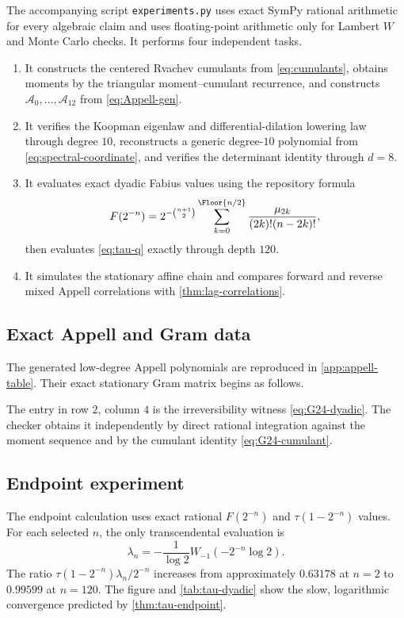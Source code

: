 \documentclass[11pt,a4paper]{article}
\theoremstyle{definition}
\theoremstyle{remark}
\newcommand{\Acal}{\mathcal A}
\begin{document}
The accompanying script \texttt{experiments.py} uses exact SymPy rational arithmetic for every algebraic claim and uses floating-point arithmetic only for Lambert $W$ and Monte Carlo checks. It performs four independent tasks.
\begin{enumerate}
\item It constructs the centered Rvachev cumulants from \eqref{eq:cumulants}, obtains moments by the triangular moment--cumulant recurrence, and constructs $\Acal_0,\ldots,\Acal_{12}$ from \eqref{eq:Appell-gen}.
\item It verifies the Koopman eigenlaw and differential-dilation lowering law through degree $10$, reconstructs a generic degree-$10$ polynomial from \eqref{eq:spectral-coordinate}, and verifies the determinant identity through $d=8$.
\item It evaluates exact dyadic Fabius values using the repository formula
\begin{equation}
 F(2^{-n})
 =2^{-\binom{n+1}{2}}
 \sum_{k=0}^{\Floor{n/2}}
 \frac{\mu_{2k}}{(2k)!(n-2k)!},
 \label{eq:dyadic-F-compute}
\end{equation}
then evaluates \eqref{eq:tau-q} exactly through depth $120$.
\item It simulates the stationary affine chain and compares forward and reverse mixed Appell correlations with \cref{thm:lag-correlations}.
\end{enumerate}



\subsection{Exact Appell and Gram data}

The generated low-degree Appell polynomials are reproduced in \cref{app:appell-table}. Their exact stationary Gram matrix begins as follows.



The entry in row $2$, column $4$ is the irreversibility witness \eqref{eq:G24-dyadic}. The checker obtains it independently by direct rational integration against the moment sequence and by the cumulant identity \eqref{eq:G24-cumulant}.

\subsection{Endpoint experiment}

The endpoint calculation uses exact rational $F(2^{-n})$ and $\tau(1-2^{-n})$ values. For each selected $n$, the only transcendental evaluation is
\[
 \lambda_n=-\frac1{\log2}W_{-1}(-2^{-n}\log2).
\]
The ratio $\tau(1-2^{-n})\lambda_n/2^{-n}$ increases from approximately $0.63178$ at $n=2$ to $0.99599$ at $n=120$. The figure and \cref{tab:tau-dyadic} show the slow, logarithmic convergence predicted by \cref{thm:tau-endpoint}.
\end{document}
